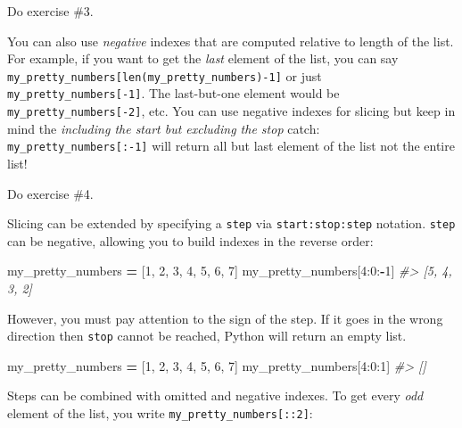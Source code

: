 \documentclass[
]{book}
\newenvironment{Shaded}{\begin{snugshade}}{\end{snugshade}}
\newcommand{\CommentTok}[1]{\textcolor[rgb]{0.56,0.35,0.01}{\textit{#1}}}
\newcommand{\DecValTok}[1]{\textcolor[rgb]{0.00,0.00,0.81}{#1}}
\newcommand{\NormalTok}[1]{#1}
\newcommand{\OperatorTok}[1]{\textcolor[rgb]{0.81,0.36,0.00}{\textbf{#1}}}
\begin{document}
Do exercise \#3.

You can also use \emph{negative} indexes that are computed relative to length of the list. For example, if you want to get the \emph{last} element of the list, you can say \texttt{my\_pretty\_numbers{[}len(my\_pretty\_numbers)-1{]}} or just \texttt{my\_pretty\_numbers{[}-1{]}}. The last-but-one element would be \texttt{my\_pretty\_numbers{[}-2{]}}, etc. You can use negative indexes for slicing but keep in mind the \emph{including the start but excluding the stop} catch: \texttt{my\_pretty\_numbers{[}:-1{]}} will return all but last element of the list not the entire list!

Do exercise \#4.

Slicing can be extended by specifying a \texttt{step} via \texttt{start:stop:step} notation. \texttt{step} can be negative, allowing you to build indexes in the reverse order:

\begin{Shaded}
\begin{Highlighting}[]
\NormalTok{my\_pretty\_numbers }\OperatorTok{=}\NormalTok{ [}\DecValTok{1}\NormalTok{, }\DecValTok{2}\NormalTok{, }\DecValTok{3}\NormalTok{, }\DecValTok{4}\NormalTok{, }\DecValTok{5}\NormalTok{, }\DecValTok{6}\NormalTok{, }\DecValTok{7}\NormalTok{]}
\NormalTok{my\_pretty\_numbers[}\DecValTok{4}\NormalTok{:}\DecValTok{0}\NormalTok{:}\OperatorTok{{-}}\DecValTok{1}\NormalTok{]}
\CommentTok{\#\textgreater{} [5, 4, 3, 2]}
\end{Highlighting}
\end{Shaded}

However, you must pay attention to the sign of the step. If it goes in the wrong direction then \texttt{stop} cannot be reached, Python will return an empty list.

\begin{Shaded}
\begin{Highlighting}[]
\NormalTok{my\_pretty\_numbers }\OperatorTok{=}\NormalTok{ [}\DecValTok{1}\NormalTok{, }\DecValTok{2}\NormalTok{, }\DecValTok{3}\NormalTok{, }\DecValTok{4}\NormalTok{, }\DecValTok{5}\NormalTok{, }\DecValTok{6}\NormalTok{, }\DecValTok{7}\NormalTok{]}
\NormalTok{my\_pretty\_numbers[}\DecValTok{4}\NormalTok{:}\DecValTok{0}\NormalTok{:}\DecValTok{1}\NormalTok{]}
\CommentTok{\#\textgreater{} []}
\end{Highlighting}
\end{Shaded}

Steps can be combined with omitted and negative indexes. To get every \emph{odd} element of the list, you write \texttt{my\_pretty\_numbers{[}::2{]}}:
\end{document}
